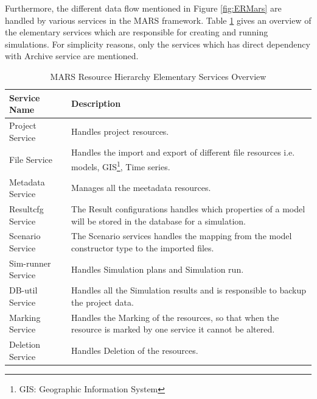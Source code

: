         \newpage
        Furthermore, the different data flow mentioned in Figure \ref{fig:ERMars} are handled by various services in the MARS framework. 
        Table \ref{table:MARS Resource Hierarchy Service Overview} gives an overview of the elementary services which are responsible for 
        creating and running simulations. For simplicity reasons, only the services
        which has direct dependency with Archive service are mentioned.
        \begin{table}[h!]
            \centering
            \begin{tabular}{|p{4cm}|p{10.5cm}|}
                \hline
                    \textbf{Service Name}  & \textbf{Description}\\
                \hline
                    Project Service & 
                    Handles project resources. \\
                \hline
                    File Service
                    & Handles the import and export of different file resources i.e. models, GIS\footnote{\label{footnote:GIS}GIS: Geographic Information System}, 
                    Time series.\\
                \hline
                    Metadata Service  & Manages all the meetadata resources.\\
                \hline
                    Resultcfg Service  & The Result configurations handles which properties of a model will be stored in the database for a simulation.\\
                \hline
                    Scenario Service  & The Scenario services handles the mapping from the model constructor type to the imported files.\\
                \hline
                    Sim-runner Service  & Handles Simulation plans and Simulation run.\\
                \hline
                    DB-util Service  & Handles all the Simulation results and is responsible to backup the project data.\\
                \hline
                    Marking Service  & Handles the Marking of the resources, so that when the resource is marked by one service it cannot be altered.\\
                \hline
                    Deletion Service  & Handles Deletion of the resources.\\
                \hline
            \end{tabular}
            \caption{MARS Resource Hierarchy Elementary Services Overview}
            \label{table:MARS Resource Hierarchy Service Overview}     
        \end{table}    
